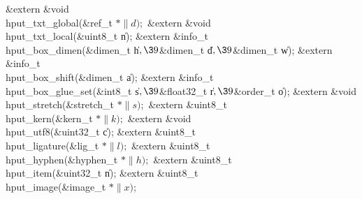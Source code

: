 \&{extern} \&{void} \\{hput\_txt\_global}(\&{ref\_t} ${}{*}\|d);{}$\6
\&{extern} \&{void} \\{hput\_txt\_local}(\&{uint8\_t} \|n);\6
\&{extern} \&{info\_t} \\{hput\_box\_dimen}(\&{dimen\_t} \|h${},\39{}$\&{dimen\_t} \|d${},\39{}$\&{dimen\_t} \|w);\6
\&{extern} \&{info\_t} \\{hput\_box\_shift}(\&{dimen\_t} \|a);\6
\&{extern} \&{info\_t} \\{hput\_box\_glue\_set}(\&{int8\_t} \|s${},\39{}$\&{float32\_t} \|r${},\39{}$\&{order\_t} \|o);\6
\&{extern} \&{void} \\{hput\_stretch}(\&{stretch\_t} ${}{*}\|s);{}$\6
\&{extern} \&{uint8\_t} \\{hput\_kern}(\&{kern\_t} ${}{*}\|k);{}$\6
\&{extern} \&{void} \\{hput\_utf8}(\&{uint32\_t} \|c);\6
\&{extern} \&{uint8\_t} \\{hput\_ligature}(\&{lig\_t} ${}{*}\|l);{}$\6
\&{extern} \&{uint8\_t} \\{hput\_hyphen}(\&{hyphen\_t} ${}{*}\|h);{}$\6
\&{extern} \&{uint8\_t} \\{hput\_item}(\&{uint32\_t} \|n);\6
\&{extern} \&{uint8\_t} \\{hput\_image}(\&{image\_t} ${}{*}\|x);{}$\6
